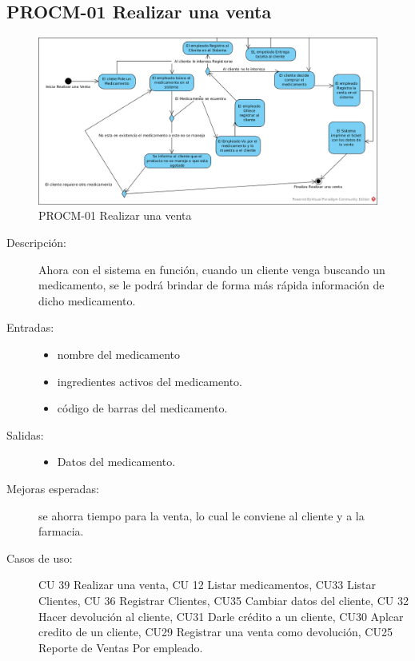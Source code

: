 \subsection{PROCM-01 Realizar una venta}

\begin{figure}[htbp]
	\begin{center}
		\includegraphics[width=.8\textwidth]{images/TOBERealizarVenta}
		\caption{PROCM-01 Realizar una venta}
		\label{fig:proceso3}
	\end{center}
\end{figure}

\begin{description}
	\item[Descripción:] Ahora con el sistema en función, cuando un cliente venga buscando un medicamento, se le podrá brindar de forma más rápida información de dicho medicamento.
	\item[Entradas:] \cdtEmpty
        \begin{itemize}
			\item nombre del medicamento
			\item ingredientes activos del medicamento.
			\item código de barras del medicamento.
        \end{itemize}
	\item[Salidas:] \cdtEmpty
        \begin{itemize}
			\item Datos del medicamento.
        \end{itemize}	
    \item[Mejoras esperadas:]se ahorra tiempo para la venta, lo cual le conviene al cliente y a la farmacia.
    \item[Casos de uso:] CU 39 Realizar una venta, CU 12 Listar medicamentos, CU33 Listar Clientes, CU 36 Registrar Clientes, CU35 Cambiar datos del cliente, CU 32 Hacer devolución al cliente, CU31 Darle crédito a un cliente, CU30 Aplcar credito de un cliente, CU29 Registrar una venta como devolución, CU25 Reporte de Ventas Por empleado.
\end{description}
